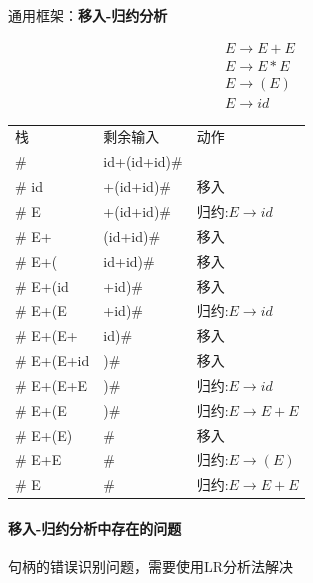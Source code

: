 \documentclass[UTF8]{ctexart} %
\begin{document}
通用框架：\textbf{移入-归约分析}

\begin{equation}
    \begin{aligned}
        E\rightarrow E+E \\
        E\rightarrow E*E \\
        E\rightarrow (E) \\
        E\rightarrow id
    \end{aligned}
\end{equation}

\begin{table}[H]
    \centering
    \begin{tabular}{|p{3cm}<{\centering}|p{3cm}<{\centering}|p{3cm}<{\centering}|}
        \hline
        栈          & 剩余输入         & 动作                    \\
        \#         & id+(id+id)\# &                       \\
        \# id      & +(id+id)\#   & 移入                    \\
        \# E       & +(id+id)\#   & 归约:$E\rightarrow id$  \\
        \# E+      & (id+id)\#    & 移入                    \\
        \# E+(     & id+id)\#     & 移入                    \\
        \# E+(id   & +id)\#       & 移入                    \\
        \# E+(E    & +id)\#       & 归约:$E\rightarrow id$  \\
        \# E+(E+   & id)\#        & 移入                    \\
        \# E+(E+id & )\#          & 移入                    \\
        \# E+(E+E  & )\#          & 归约:$E\rightarrow id$  \\
        \# E+(E    & )\#          & 归约:$E\rightarrow E+E$ \\
        \# E+(E)   & \#           & 移入                    \\
        \# E+E     & \#           & 归约:$E\rightarrow (E)$ \\
        \# E       & \#           & 归约:$E\rightarrow E+E$ \\
        \hline
    \end{tabular}
\end{table}

\paragraph{移入-归约分析中存在的问题} 句柄的错误识别问题，需要使用LR分析法解决
\end{document}
